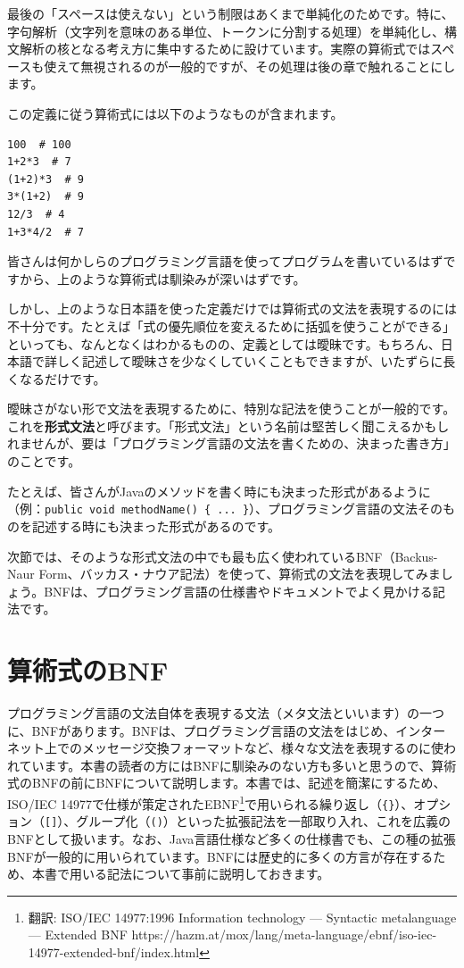 最後の「スペースは使えない」という制限はあくまで単純化のためです。特に、字句解析（文字列を意味のある単位、トークンに分割する処理）を単純化し、構文解析の核となる考え方に集中するために設けています。実際の算術式ではスペースも使えて無視されるのが一般的ですが、その処理は後の章で触れることにします。

この定義に従う算術式には以下のようなものが含まれます。

\begin{verbatim}
100  # 100
1+2*3  # 7
(1+2)*3  # 9
3*(1+2)  # 9
12/3  # 4
1+3*4/2  # 7
\end{verbatim}

皆さんは何かしらのプログラミング言語を使ってプログラムを書いているはずですから、上のような算術式は馴染みが深いはずです。

しかし、上のような日本語を使った定義だけでは算術式の文法を表現するのには不十分です。たとえば「式の優先順位を変えるために括弧を使うことができる」といっても、なんとなくはわかるものの、定義としては曖昧です。もちろん、日本語で詳しく記述して曖昧さを少なくしていくこともできますが、いたずらに長くなるだけです。

曖昧さがない形で文法を表現するために、特別な記法を使うことが一般的です。これを\textbf{形式文法}と呼びます。「形式文法」という名前は堅苦しく聞こえるかもしれませんが、要は「プログラミング言語の文法を書くための、決まった書き方」のことです。

たとえば、皆さんがJavaのメソッドを書く時にも決まった形式があるように（例：\texttt{public\ void\ methodName()\ \{\ ...\ \}}）、プログラミング言語の文法そのものを記述する時にも決まった形式があるのです。

次節では、そのような形式文法の中でも最も広く使われているBNF（Backus-Naur
Form、バッカス・ナウア記法）を使って、算術式の文法を表現してみましょう。BNFは、プログラミング言語の仕様書やドキュメントでよく見かける記法です。

\hypertarget{chapter2-ux7b97ux8853ux5f0fux306ebnf}{%
\section{算術式のBNF}\label{chapter2-ux7b97ux8853ux5f0fux306ebnf}}

プログラミング言語の文法自体を表現する文法（メタ文法といいます）の一つに、BNFがあります。BNFは、プログラミング言語の文法をはじめ、インターネット上でのメッセージ交換フォーマットなど、様々な文法を表現するのに使われています。本書の読者の方にはBNFに馴染みのない方も多いと思うので、算術式のBNFの前にBNFについて説明します。本書では、記述を簡潔にするため、ISO/IEC
14977で仕様が策定されたEBNF\footnote{翻訳: ISO/IEC 14977:1996
  Information technology --- Syntactic metalanguage --- Extended BNF
  https://hazm.at/mox/lang/meta-language/ebnf/iso-iec-14977-extended-bnf/index.html}で用いられる繰り返し（\texttt{\{\}}）、オプション（\texttt{{[}{]}}）、グループ化（\texttt{()}）といった拡張記法を一部取り入れ、これを広義のBNFとして扱います。なお、Java言語仕様など多くの仕様書でも、この種の拡張BNFが一般的に用いられています。BNFには歴史的に多くの方言が存在するため、本書で用いる記法について事前に説明しておきます。

